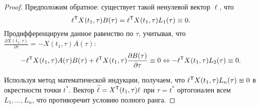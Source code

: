 \begin{proof}
	Предположим обратное: существует такой ненулевой вектор $\ell$, что
	\begin{equation*}
	  \ell^{\mathsf{T}} X(t_1, \tau) B(\tau) = \ell^{\mathsf{T}} X(t_1, \tau) L_{1}(\tau) \equiv 0.
	\end{equation*}
	Продифференцируем данное равенство по $\tau$, учитывая, что
	$\frac{\partial X(t_1, \tau)}{\partial \tau} = -X(t_1, \tau) A(\tau)$:
	\begin{equation*}
	  -\ell^{\mathsf{T}} X(t_1, \tau) A(\tau) B(\tau) + \ell^{\mathsf{T}} X(t_1, \tau) \frac{\partial B(\tau)}{\partial \tau} \equiv 0
	  \Leftrightarrow
	  -\ell^{\mathsf{T}} X(t_1, \tau) L_2(\tau) \equiv 0.
	\end{equation*}
	
	Используя метод математической индукции, получаем, что $\ell^{\mathsf{T}} X(t_1, \tau) L_n(\tau) \equiv 0$
	в окрестности точки $t^*$. Вектор $\widetilde{\ell} = X^{\mathsf{T}}(t_1, \tau) \ell$ при $\tau = t^*$ ортогонален
	всем $L_1, \ldots, L_n$, что противоречит условию полного ранга.
\end{proof}